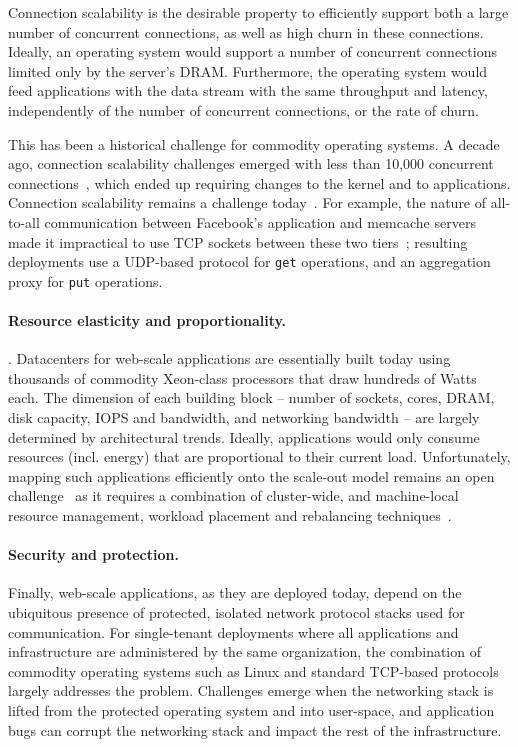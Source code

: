 Connection scalability is the desirable property to efficiently
support both a large number of concurrent connections, as well as high
churn in these connections.  Ideally, an operating system would
support a number of concurrent connections limited only by the
server's DRAM.  Furthermore, the operating system would feed
applications with the data stream with the same throughput and
latency, independently of the number of concurrent connections, or the
rate of churn.
 
This has been a historical challenge for commodity operating systems.
A decade ago, connection scalability challenges emerged with less than
10,000 concurrent connections~\cite{theC10Kproblem}, which ended up
requiring changes to the kernel and to applications.  Connection
scalability remains a challenge today~\cite{theC10Mproblem}.  For
example, the nature of all-to-all communication between Facebook's
application and memcache servers made it impractical to use TCP
sockets between these two tiers~\cite{nishtala2013scaling}; resulting
deployments use a UDP-based protocol for \texttt{get} operations, and
an aggregation proxy for \texttt{put} operations.


\paragraph{Resource elasticity and proportionality.}

. Datacenters for web-scale applications are
essentially built today using thousands of commodity Xeon-class
processors that draw hundreds of Watts each.  The dimension of each
building block -- number of sockets, cores, DRAM, disk capacity, IOPS
and bandwidth, and networking bandwidth -- are largely determined by
architectural trends.  Ideally, applications would only consume
resources (incl. energy) that are proportional to their current load.
Unfortunately, mapping such applications efficiently onto the
scale-out model remains an open challenge~\cite{missing} as it requires
a combination of cluster-wide, and machine-local resource management,
workload placement and rebalancing techniques~\cite{missing,missing}.


\paragraph{Security and protection.}

Finally, web-scale applications, as they are deployed today, depend on
the ubiquitous presence of protected, isolated network protocol
stacks used for communication.  For single-tenant deployments where
all applications and infrastructure are administered by the same
organization, the combination of commodity operating systems such as
Linux and standard TCP-based protocols largely addresses the problem.
Challenges emerge when the networking stack is lifted from the
protected operating system and into user-space, and application bugs
can corrupt the networking stack and impact the rest of the
infrastructure.


